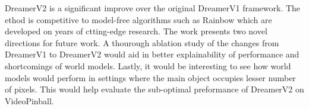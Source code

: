 \documentclass[11pt,letterpaper]{article}
\begin{document}
DreamerV2 is a significant improve over the original DreamerV1 framework. The ethod is competitive to model-free algorithms such as Rainbow which are developed on years of ctting-edge research. The work presents two novel directions for future work. A thourough ablation study of the changes from DreamerV1 to DreamerV2 would aid in better explainability of performance and shortcomings of world models. Lastly, it would be interesting to see how world models would perform in settings where the main object occupies lesser number of pixels. This would help evaluate the sub-optimal preformance of DreamerV2 on VideoPinball. 
\end{document}
